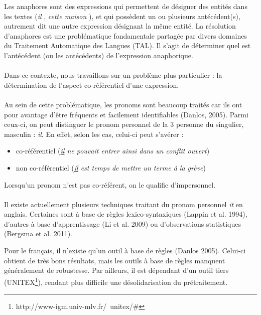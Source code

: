 \documentclass[a4paper,12pt]{article}
\begin{document}
Les anaphores sont des expressions qui permettent de désigner des entités dans les textes (\og \textit{il} \fg{}, \og \textit{cette maison} \fg{}), et qui possèdent un ou plusieurs antécédent(s), autrement dit une autre expression désignant la même entité. La résolution  d'anaphores est une problématique fondamentale partagée par divers domaines du Traitement Automatique des Langues (TAL). Il s'agit de déterminer quel est l'antécédent (ou les antécédents) de l'expression anaphorique.

\paragraph{}
Dans ce contexte, nous travaillons sur un problème plus particulier : la détermination de l'aspect co-référentiel d'une expression.

\paragraph{}
Au sein de cette problématique, les pronoms sont beaucoup traités car ils ont pour avantage d'être fréquents et facilement identifiables (Danlos\cite{danlos:ilimp:taln2005}, 2005). 
Parmi ceux-ci, on peut distinguer le pronom personnel de la 3 personne du singulier, masculin : \og{}\textit{il}\fg{}. 
En effet, selon les cas, celui-ci peut s'avérer : 
\begin{itemize}
 \item co-référentiel (\og{}\textit{\underline{il} ne pouvait entrer ainsi dans un conflit ouvert}\fg{})
 \item non co-référentiel (\og{}\textit{\underline{il} est temps de mettre un terme à la grève}\fg{})
\end{itemize}
Lorsqu'un pronom n'est pas co-référent, on le qualifie d'impersonnel.

\paragraph{}
Il existe actuellement plusieurs techniques traitant du pronom personnel \og{}\textit{it}\fg{} en anglais.
Certaines sont à base de règles lexico-syntaxiques (Lappin et al.\cite{Lappin:1994:APA:203987.203989} 1994), d'autres à base d'apprentissage (Li et al.\cite{Li:2009:IPU:1622716.1622726} 2009) ou d'observations statistiques (Bergsma et al.\cite{Bergsma:11} 2011).


Pour le français, il n'existe qu'un outil à base de règles (Danlos 2005). Celui-ci obtient de très bons résultats, mais les outils à base de règles manquent généralement de robustesse. Par ailleurs, il est dépendant d'un outil tiers (UNITEX\footnote{http://www-igm.univ-mlv.fr/~unitex/\#}), rendant plus difficile une désolidarisation du prétraitement. 
\end{document}
